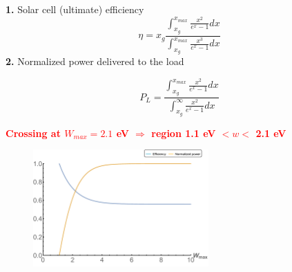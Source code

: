 \documentclass{beamer}
\begin{document}
\begin{frame}%

\textbf{1.} Solar cell (ultimate) efficiency
$$ \eta = x_{g}\frac{\int_{x_{g}}^{x_{max}}\frac{x^2}{e^x-1}dx}{\int_{x_{g}}^{x_{max}}\frac{x^3}{e^x-1}dx}$$  
\textbf{2.} Normalized power delivered to the load

$$ P_{L} = \frac{\int_{x_{g}}^{x_{max}}\frac{x^2}{e^x-1}dx}{\int_{x_{g}}^{\infty}\frac{x^2}{e^x-1}dx}$$

\begin{center}
\textcolor{red}{\textbf{Crossing at $W_{max} = 2.1$ eV $\Rightarrow$ region 1.1 eV $< w <$ 2.1 eV}}
\end{center}

\vspace{-0.2cm}

\begin{figure} [t]
\includegraphics[width=0.6\textwidth]{figures/figure2_solar_cell_optimization.pdf}
\end{figure}

\end{frame}
\end{document}
